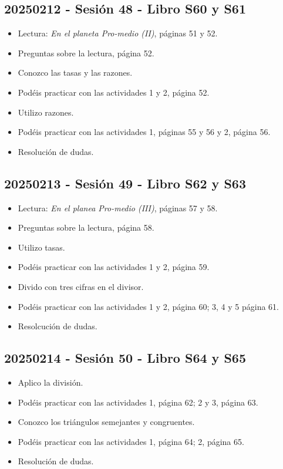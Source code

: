 \documentclass[a4paper,12pt]{article}
\begin{document}
\subsection{20250212 - Sesión 48 - Libro S60 y S61}

\begin{itemize}
    \item Lectura: \textit{En el planeta Pro-medio (II)}, páginas 51 y 52.
    \item Preguntas sobre la lectura, página 52.
    \item Conozco las tasas y las razones.
    \item Podéis practicar con las actividades 1 y 2, página 52.
    \item Utilizo razones.
    \item Podéis practicar con las actividades 1, páginas 55 y 56 y 2, página 56.
    \item Resolución de dudas.
\end{itemize}

\subsection{20250213 - Sesión 49 - Libro S62 y S63}

\begin{itemize}
    \item Lectura: \textit{En el planea Pro-medio (III)}, páginas 57 y 58.
    \item Preguntas sobre la lectura, página 58.
    \item Utilizo tasas.
    \item Podéis practicar con las actividades 1 y 2, página 59.
    \item Divido con tres cifras en el divisor.
    \item Podéis practicar con las actividades 1 y 2, página 60; 3, 4 y 5 página 61.
    \item Resolcución de dudas.
\end{itemize}

\subsection{20250214 - Sesión 50 - Libro S64 y S65}

\begin{itemize}
    \item Aplico la división.
    \item Podéis practicar con las actividades 1, página 62; 2 y 3, página 63.
    \item Conozco los triángulos semejantes y congruentes.
    \item Podéis practicar con las actividades 1, página 64; 2, página 65.
    \item Resolución de dudas.
\end{itemize}
\end{document}
